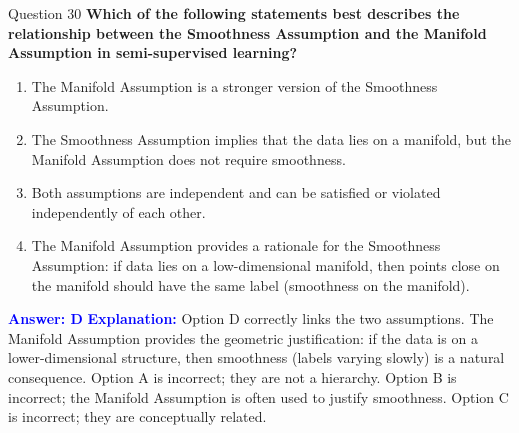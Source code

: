 \documentclass{beamer}
\begin{document}
	\begin{frame}{Question 30}
		\textbf{Which of the following statements best describes the relationship between the Smoothness Assumption and the Manifold Assumption in semi-supervised learning?}
		\begin{enumerate}
			\item The Manifold Assumption is a stronger version of the Smoothness Assumption.
			\item The Smoothness Assumption implies that the data lies on a manifold, but the Manifold Assumption does not require smoothness.
			\item Both assumptions are independent and can be satisfied or violated independently of each other.
			\item The Manifold Assumption provides a rationale for the Smoothness Assumption: if data lies on a low-dimensional manifold, then points close on the manifold should have the same label (smoothness on the manifold).
		\end{enumerate}
		\vspace{0.2cm}
		\textcolor{blue}{\textbf{Answer: D}}
		\vspace{0.2cm}
		\textcolor{blue}{\textbf{Explanation:}} Option D correctly links the two assumptions. The Manifold Assumption provides the geometric justification: if the data is on a lower-dimensional structure, then smoothness (labels varying slowly) is a natural consequence. Option A is incorrect; they are not a hierarchy. Option B is incorrect; the Manifold Assumption is often used to justify smoothness. Option C is incorrect; they are conceptually related.
	\end{frame}
	
\end{document}
